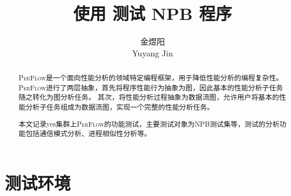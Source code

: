 \documentclass[lang=cn,11pt,a4paper]{elegantpaper}
\title{使用 \perflow{} 测试 NPB 程序}
\author{金煜阳 \\ Yuyang Jin}
\institute{清华大学计算机系 \\ PACMAN实验室}
\date{\zhtoday}
\newcommand{\perflow}{\textsc{PerFlow}\xspace}
\begin{document}
\maketitle

\begin{abstract}
  \perflow{}是一个面向性能分析的领域特定编程框架，用于降低性能分析的编程复杂性。
  \perflow{}进行了两层抽象，首先将程序性能行为抽象为图，因此基本的性能分析子任务随之转化为图分析任务。
  其次，将性能分析过程抽象为数据流图，允许用户将基本的性能分析子任务组成为数据流图，实现一个完整的性能分析任务。
  
  本文记录yes集群上\perflow{}的功能测试，主要测试对象为NPB测试集等，测试的分析功能包括通信模式分析、进程相似性分析等。
\end{abstract}

\section*{测试环境}







\appendix
\addappheadtotoc
\end{document}
